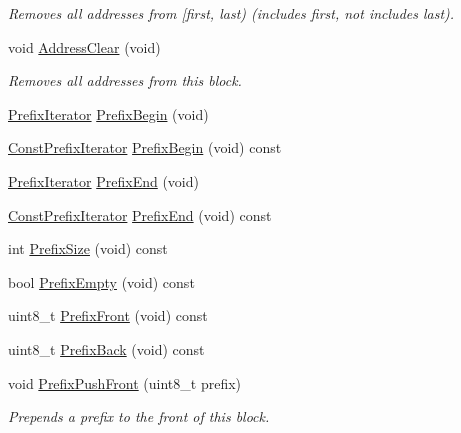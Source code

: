 \begin{DoxyCompactItemize}
\begin{DoxyCompactList}\small\item\em Removes all addresses from \mbox{[}first, last) (includes first, not includes last). \end{DoxyCompactList}\item 
void \hyperlink{classns3_1_1PbbAddressBlock_ab7220a69ebd43c9045ba31db40fb62be}{Address\+Clear} (void)
\begin{DoxyCompactList}\small\item\em Removes all addresses from this block. \end{DoxyCompactList}\item 
\hyperlink{classns3_1_1PbbAddressBlock_a0c36abcfa36790bcbd156d036e103fa4}{Prefix\+Iterator} \hyperlink{classns3_1_1PbbAddressBlock_a25bc50d9f7ba1a17821a0907ac7ba352}{Prefix\+Begin} (void)
\item 
\hyperlink{classns3_1_1PbbAddressBlock_ac99d39169c106574b8c2aa51646bf404}{Const\+Prefix\+Iterator} \hyperlink{classns3_1_1PbbAddressBlock_ab40e15be42cfc6d164163d1eda933058}{Prefix\+Begin} (void) const 
\item 
\hyperlink{classns3_1_1PbbAddressBlock_a0c36abcfa36790bcbd156d036e103fa4}{Prefix\+Iterator} \hyperlink{classns3_1_1PbbAddressBlock_a10027797f34518ea3921a610011fc9d7}{Prefix\+End} (void)
\item 
\hyperlink{classns3_1_1PbbAddressBlock_ac99d39169c106574b8c2aa51646bf404}{Const\+Prefix\+Iterator} \hyperlink{classns3_1_1PbbAddressBlock_a990d2aab258dd511bbc3b11a83382be6}{Prefix\+End} (void) const 
\item 
int \hyperlink{classns3_1_1PbbAddressBlock_a5c19f01e9a4e7f3bf60a4241cbb89fe7}{Prefix\+Size} (void) const 
\item 
bool \hyperlink{classns3_1_1PbbAddressBlock_a1e19b5850adb00b3b4f0e53ae25d4e82}{Prefix\+Empty} (void) const 
\item 
uint8\+\_\+t \hyperlink{classns3_1_1PbbAddressBlock_a3001703fcd36eaca33e3225da13a33ad}{Prefix\+Front} (void) const 
\item 
uint8\+\_\+t \hyperlink{classns3_1_1PbbAddressBlock_a512835e96f004db8e41cf295b3df8fff}{Prefix\+Back} (void) const 
\item 
void \hyperlink{classns3_1_1PbbAddressBlock_a1057ade11f685df42d0bd6ad6b55442c}{Prefix\+Push\+Front} (uint8\+\_\+t prefix)
\begin{DoxyCompactList}\small\item\em Prepends a prefix to the front of this block. \end{DoxyCompactList}\item 

\end{DoxyCompactItemize}
